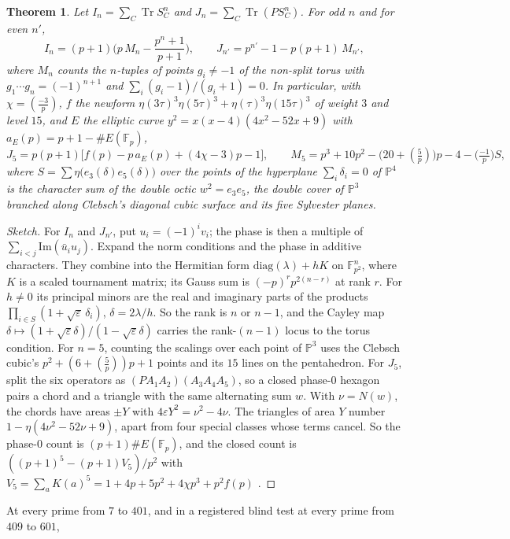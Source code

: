 \documentclass[11pt]{article}
\newtheorem{theorem}{Theorem}
\theoremstyle{remark}
\newcommand{\Tr}{\operatorname{Tr}}
\begin{document}
\begin{theorem}\label{thm:fifth}
Let $I_n=\sum_C\Tr S_C^n$ and $J_n=\sum_C\Tr(PS_C^n)$. For odd $n$ and for even $n'$,
\[
I_n=(p+1)\Big(p\,M_n-\frac{p^n+1}{p+1}\Big),\qquad J_{n'}=p^{n'}-1-p(p+1)\,M_{n'},
\]
where $M_n$ counts the $n$-tuples of points $g_i\ne-1$ of the non-split torus with $g_1\cdots g_n=(-1)^{n+1}$ and
$\sum_i(g_i-1)/(g_i+1)=0$. In particular, with $\chi=(\tfrac{-3}{p})$, $f$ the newform
$\eta(3\tau)^3\eta(5\tau)^3+\eta(\tau)^3\eta(15\tau)^3$ of weight $3$ and level $15$, and $E$ the elliptic curve
$y^2=x(x-4)(4x^2-52x+9)$ with $a_E(p)=p+1-\#E(\mathbb F_p)$,
\[
J_5=p(p+1)\big[f(p)-p\,a_E(p)+(4\chi-3)p-1\big],\qquad
M_5=p^3+10p^2-\big(20+(\tfrac5p)\big)p-4-\big(\tfrac{-1}{p}\big)S,
\]
where $S=\sum\eta\big(e_3(\delta)e_5(\delta)\big)$ over the points of the hyperplane $\sum_i\delta_i=0$ of
$\mathbb P^4$ is the character sum of the double octic $w^2=e_3e_5$, the double cover of $\mathbb P^3$ branched along
Clebsch's diagonal cubic surface \cite{Clebsch1871} and its five Sylvester planes.
\end{theorem}
\begin{proof}[Sketch]
For $I_n$ and $J_{n'}$, put $u_i=(-1)^iv_i$; the phase is then a multiple of $\sum_{i<j}\mathrm{Im}(\bar u_iu_j)$. Expand the
norm conditions and the phase in additive characters. They combine into the Hermitian form $\mathrm{diag}(\lambda)+hK$
on $\mathbb F_{p^2}^n$, where $K$ is a scaled tournament matrix; its Gauss sum is $(-p)^rp^{2(n-r)}$ at rank $r$. For
$h\ne0$ its principal minors are the real and imaginary parts of the products $\prod_{i\in S}(1+\sqrt\varepsilon\,\delta_i)$,
$\delta=2\lambda/h$. So the rank is $n$ or $n-1$, and the Cayley map $\delta\mapsto(1+\sqrt\varepsilon\delta)/(1-\sqrt
\varepsilon\delta)$ carries the rank-$(n-1)$ locus to the torus condition. For $n=5$, counting the scalings over each
point of $\mathbb P^3$ uses the Clebsch cubic's $p^2+(6+(\tfrac5p))p+1$ points and its $15$ lines on the pentahedron.
For $J_5$, split the six operators as $(PA_1A_2)(A_3A_4A_5)$, so a closed phase-$0$ hexagon pairs a chord and a triangle
with the same alternating sum $w$. With $\nu=N(w)$, the chords have areas $\pm Y$ with $4\varepsilon Y^2=\nu^2-4\nu$.
The triangles of area $Y$ number $1-\eta(4\nu^2-52\nu+9)$, apart from four special classes whose terms cancel. So the
phase-$0$ count is $(p+1)\#E(\mathbb F_p)$, and the closed count is $((p+1)^5-(p+1)V_5)/p^2$ with
$V_5=\sum_aK(a)^5=1+4p+5p^2+4\chi p^3+p^2f(p)$ \cite{PTvdV1992}.
\end{proof}
At every prime from $7$ to $401$, and in a registered blind test at every prime from $409$ to $601$,
\end{document}
